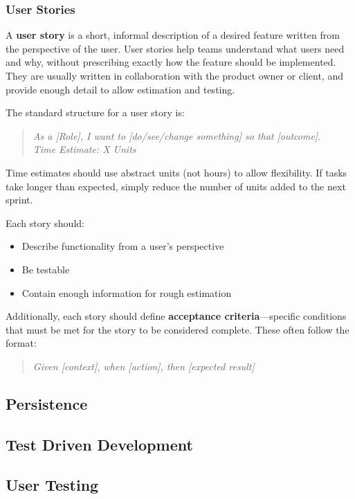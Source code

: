 \documentclass{article}
\begin{document}
\subsubsection{User Stories}

A \textbf{user story} is a short, informal description of a desired feature written from the perspective of the user. User stories help teams understand what users need and why, without prescribing exactly how the feature should be implemented. They are usually written in collaboration with the product owner or client, and provide enough detail to allow estimation and testing.

The standard structure for a user story is:

\begin{quote}
\textit{As a [Role], I want to [do/see/change something] so that [outcome].\\
Time Estimate: X Units}
\end{quote}

Time estimates should use abstract units (not hours) to allow flexibility. If tasks take longer than expected, simply reduce the number of units added to the next sprint.

Each story should:
\begin{itemize}
  \item Describe functionality from a user's perspective
  \item Be testable
  \item Contain enough information for rough estimation
\end{itemize}

Additionally, each story should define \textbf{acceptance criteria}—specific conditions that must be met for the story to be considered complete. These often follow the format:

\begin{quote}
\textit{Given [context], when [action], then [expected result]}
\end{quote}


\subsection{Persistence}

\subsection{Test Driven Development}

\subsection{User Testing}
\end{document}
